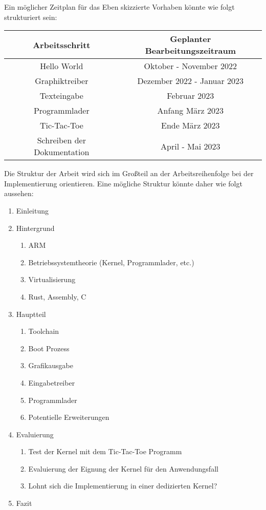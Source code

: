 \documentclass{scrartcl}
\begin{document}
Ein möglicher Zeitplan für das Eben skizzierte Vorhaben könnte wie folgt strukturiert sein:

\vspace*{0.5cm}

\begin{tabular}{|c|c|}
    \hline
    \textbf{Arbeitsschritt} & \textbf{Geplanter Bearbeitungszeitraum} \\ \hline
    Hello World & Oktober - November 2022 \\
    Graphiktreiber & Dezember 2022 - Januar 2023 \\
    Texteingabe & Februar 2023 \\
    Programmlader & Anfang März 2023 \\
    Tic-Tac-Toe & Ende März 2023 \\
    Schreiben der Dokumentation & April - Mai 2023 \\
    \hline
\end{tabular}

\vspace*{0.5cm}

Die Struktur der Arbeit wird sich im Großteil an der Arbeitsreihenfolge bei der Implementierung orientieren.
Eine mögliche Struktur könnte daher wie folgt aussehen:

\begin{enumerate}
    \item Einleitung
    \item Hintergrund
    \begin{enumerate}
    \item ARM
    \item Betriebssystemtheorie (Kernel, Programmlader, etc.)
    \item Virtualisierung
    \item Rust, Assembly, C
    \end{enumerate}
    \item Hauptteil
    \begin{enumerate}
    \item Toolchain
    \item Boot Prozess
    \item Grafikausgabe
    \item Eingabetreiber
    \item Programmlader
    \item Potentielle Erweiterungen
\end{enumerate}
    \item Evaluierung
    \begin{enumerate}
        \item Test der Kernel mit dem Tic-Tac-Toe Programm
        \item Evaluierung der Eignung der Kernel für den Anwendungsfall
        \item Lohnt sich die Implementierung in einer dedizierten Kernel?
    \end{enumerate}
    \item Fazit
\end{enumerate}
\end{document}
